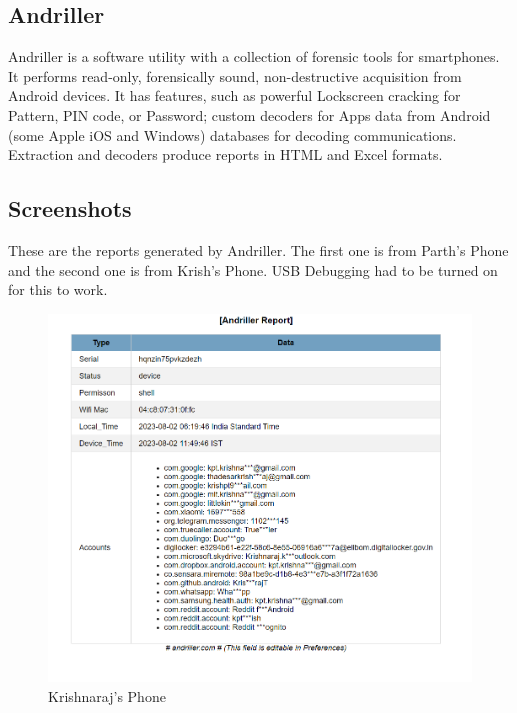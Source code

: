 \documentclass[11pt]{article}
\begin{document}
\subsection{Andriller}
Andriller is a software utility with a collection of forensic tools for smartphones. It performs read-only, forensically sound, non-destructive acquisition from Android devices. It has features, such as powerful Lockscreen cracking for Pattern, PIN code, or Password; custom decoders for Apps data from Android (some Apple iOS and Windows) databases for decoding communications. Extraction and decoders produce reports in HTML and Excel formats.

\subsection{Screenshots}

These are the reports generated by Andriller. The first one is from Parth's Phone and the second one is from Krish's Phone. USB Debugging had to be turned on for this to work.


\begin{figure}[H]
    \centering
    \includegraphics[width=.95\textwidth]{./Screenshot 2023-08-02 062105.png}
    \caption{Krishnaraj's Phone}
\end{figure}
\end{document}
